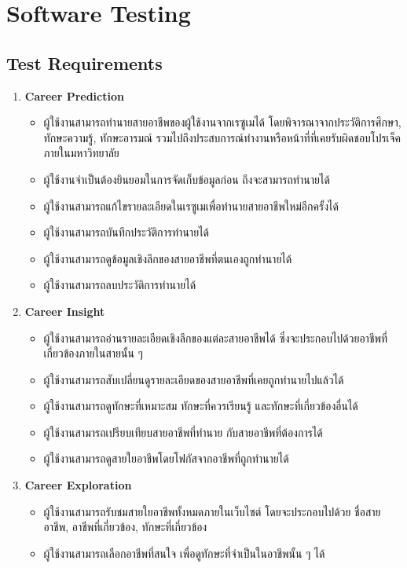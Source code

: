 \section{Software Testing}
\subsection{Test Requirements}
\begin{enumerate}
    \item \textbf{Career Prediction}
          \begin{itemize}
              \item ผู้ใช้งานสามารถทำนายสายอาชีพของผู้ใช้งานจากเรซูเมได้ โดยพิจารณาจากประวัติการศึกษา, ทักษะความรู้, ทักษะอารมณ์ รวมไปถึงประสบการณ์ทำงานหรือหน้าที่ที่เคยรับผิดชอบโปรเจ็คภายในมหาวิทยาลัย
              \item ผู้ใช้งานจำเป็นต้องยินยอมในการจัดเก็บข้อมูลก่อน ถึงจะสามารถทำนายได้
              \item ผู้ใช้งานสามารถแก้ไขรายละเอียดในเรซูเมเพื่อทำนายสายอาชีพใหม่อีกครั้งได้
              \item ผู้ใช้งานสามารถบันทึกประวัติการทำนายได้
              \item ผู้ใช้งานสามารถดูข้อมูลเชิงลึกของสายอาชีพที่ตนเองถูกทำนายได้
              \item ผู้ใช้งานสามารถลบประวัติการทำนายได้
          \end{itemize}
    \item \textbf{Career Insight}
          \begin{itemize}
              \item ผู้ใช้งานสามารถอ่านรายละเอียดเชิงลึกของแต่ละสายอาชีพได้ ซึ่งจะประกอบไปด้วยอาชีพที่เกี่ยวข้องภายในสายนั้น ๆ
              \item ผู้ใช้งานสามารถสับเปลี่ยนดูรายละเอียดของสายอาชีพที่เคยถูกทำนายไปแล้วได้
              \item ผู้ใช้งานสามารถดูทักษะที่เหมาะสม ทักษะที่ควรเรียนรู้ และทักษะที่เกี่ยวข้องอื่นได้
              \item ผู้ใช้งานสามารถเปรียบเทียบสายอาชีพที่ทำนาย กับสายอาชีพที่ต้องการได้
              \item ผู้ใช้งานสามารถดูสายใยอาชีพโดยโฟกัสจากอาชีพที่ถูกทำนายได้
          \end{itemize}
    \item \textbf{Career Exploration}
          \begin{itemize}
              \item ผู้ใช้งานสามารถรับชมสายใยอาชีพทั้งหมดภายในเว็บไซต์ โดยจะประกอบไปด้วย ชื่อสายอาชีพ, อาชีพที่เกี่ยวข้อง, ทักษะที่เกี่ยวข้อง
              \item ผู้ใช้งานสามารถเลือกอาชีพที่สนใจ เพื่อดูทักษะที่จำเป็นในอาชีพนั้น ๆ ได้
          \end{itemize}
\end{enumerate}
\label{sec:test-subsection}
